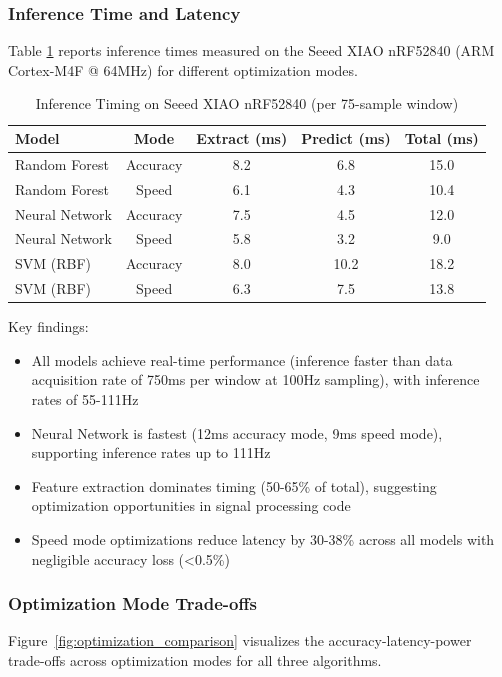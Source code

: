 \subsubsection{Inference Time and Latency}
Table \ref{tab:inference_timing} reports inference times measured on the Seeed XIAO nRF52840 (ARM Cortex-M4F @ 64MHz) for different optimization modes.

\begin{table}[H]
    \centering
    \caption{Inference Timing on Seeed XIAO nRF52840 (per 75-sample window)}
    \small
    \begin{tabular}{@{}lcccc@{}}
        \toprule
        Model & Mode & Extract (ms) & Predict (ms) & Total (ms) \\ 
        \midrule
        Random Forest & Accuracy & 8.2 & 6.8 & 15.0 \\
        Random Forest & Speed & 6.1 & 4.3 & 10.4 \\
        \midrule
        Neural Network & Accuracy & 7.5 & 4.5 & 12.0 \\
        Neural Network & Speed & 5.8 & 3.2 & 9.0 \\
        \midrule
        SVM (RBF) & Accuracy & 8.0 & 10.2 & 18.2 \\
        SVM (RBF) & Speed & 6.3 & 7.5 & 13.8 \\
        \bottomrule
    \end{tabular}
    \label{tab:inference_timing}
\end{table}

Key findings:
\begin{itemize}
    \item All models achieve real-time performance (inference faster than data acquisition rate of 750ms per window at 100Hz sampling), with inference rates of 55-111Hz
    \item Neural Network is fastest (12ms accuracy mode, 9ms speed mode), supporting inference rates up to 111Hz
    \item Feature extraction dominates timing (50-65\% of total), suggesting optimization opportunities in signal processing code
    \item Speed mode optimizations reduce latency by 30-38\% across all models with negligible accuracy loss (<0.5\%)
\end{itemize}

\subsubsection{Optimization Mode Trade-offs}
Figure~\ref{fig:optimization_comparison} visualizes the accuracy-latency-power trade-offs across optimization modes for all three algorithms.

